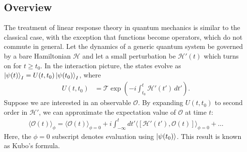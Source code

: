 \documentclass[reprint,
nofootinbib,
amsmath,amssymb,
aps]{revtex4-1}
\newcommand{\lp}{\left(}
\newcommand{\rp}{\right)}
\begin{document}
\subsection{Overview}
The treatment of linear response theory in quantum mechanics is similar to the classical case, with the exception that functions become operators, which do not commute in general. Let the dynamics of a generic quantum system be governed by a bare Hamiltonian $\mathcal{H}$ and let a small perturbation be $\mathcal{H}'(t)$ which turns on for $t\geq t_0$. In the interaction picture, the states evolve as $\ket{\psi(t)}_I = U(t,t_0) \ket{\psi(t_0)}_I$, where
\begin{align*}
U(t,t_0) 
&= \mathcal{T} \exp\lp -i \int_{t_0}^t  \mathcal{H}'(t')\,dt'\rp.
\end{align*}
Suppose we are interested in an observable $\mathcal{O}$. By expanding $U(t,t_0)$ to second order in $\mathcal{H}'$, we can approximate the expectation value of $\mathcal{O}$ at time $t$:
\begin{align*}
\langle \mathcal{O}(t) \rangle_{\phi} = \langle \mathcal{O}(t) \rangle_{\phi = 0} + i \int_{-\infty}^t dt' \langle [\mathcal{H'}(t'), \mathcal{O} (t)] \rangle_{\phi=0} + \dots
\end{align*}
Here, the $\phi=0$ subscript denotes evaluation using $\ket{\psi(t_0)}$.  This result is known as Kubo's formula. 
\end{document}
